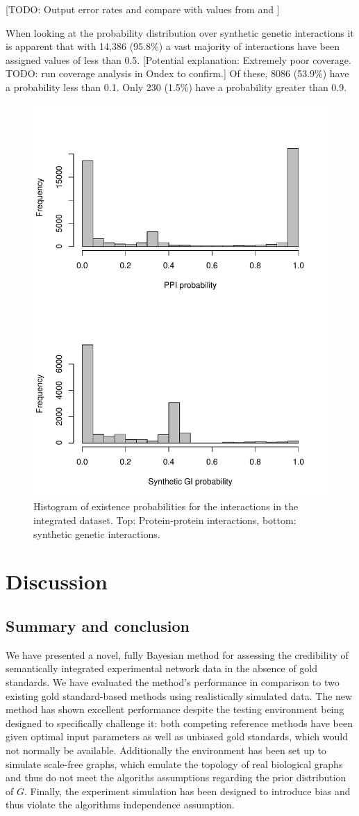 \documentclass{bioinfo}
\newcommand{\note}[1]{{\color{red}[#1]}}
\begin{document}
\note{TODO: Output error rates and compare with values from \citep{dhaeseleer_estimating_2004} and \citep{hart_how_2006}} 

When looking at the probability distribution over synthetic genetic interactions it is apparent that with 14,386 (95.8\%) a vast majority of interactions have been assigned values of less than 0.5. \note{Potential explanation: Extremely poor coverage. TODO: run coverage analysis in Ondex to confirm.} Of these, 8086 (53.9\%) have a probability less than 0.1. Only 230 (1.5\%) have a probability greater than 0.9.



\begin{figure}[!tpb]
\centerline{\includegraphics[width=.5\textwidth]{fig2.pdf}}
\caption{Histogram of existence probabilities for the interactions in the integrated dataset. Top: Protein-protein interactions, bottom: synthetic genetic interactions.}
\label{ppi+gi}
\end{figure}


\section{Discussion}
\subsection{Summary and conclusion}

We have presented a novel, fully Bayesian method for assessing the credibility of semantically integrated experimental network data in the absence of gold standards. We have evaluated the method's performance in comparison to two existing gold standard-based methods using realistically simulated data. The new method has shown excellent performance despite the testing environment being designed to specifically challenge it: both competing reference methods have been given optimal input parameters as well as unbiased gold standards, which would not normally be available. Additionally the environment has been set up to simulate scale-free graphs, which emulate the topology of real biological graphs and thus do not meet the algoriths assumptions regarding the prior distribution of $G$. Finally, the experiment simulation has been designed to introduce bias and thus violate the algorithms independence assumption.
\end{document}
